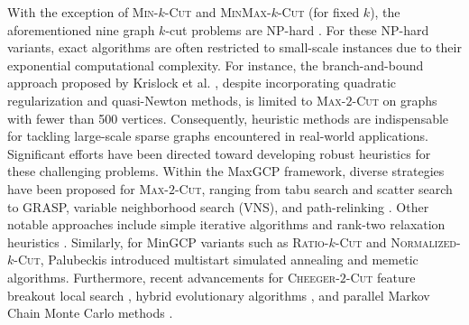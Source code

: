 \documentclass[12pt, a4paper]{article}%
\numberwithin{equation}{section}
\theoremstyle{plain}
\begin{document}
	
	With the exception of \textsc{Min}-$k$-\textsc{Cut} \cite{goldschmidt1994polynomial} and \textsc{MinMax}-$k$-\textsc{Cut} \cite{chandrasekaran2023fixed} (for fixed $k$), the aforementioned nine graph $k$-cut problems are NP-hard \cite{kann1997hardness, shahrokhi1994complexity, shao2021continuous, shi2000normalized, hagen1992new, hochbaum2013polynomial, matula1990sparsest}. For these NP-hard variants, exact algorithms are often restricted to small-scale instances due to their exponential computational complexity. For instance, the branch-and-bound approach proposed by Krislock et al. \cite{krislock2014improved}, despite incorporating quadratic regularization and quasi-Newton methods, is limited to \textsc{Max}-$2$-\textsc{Cut} on graphs with fewer than 500 vertices. Consequently, heuristic methods are indispensable for tackling large-scale sparse graphs encountered in real-world applications. Significant efforts have been directed toward developing robust heuristics for these challenging problems. Within the MaxGCP framework, diverse strategies have been proposed for \textsc{Max}-$2$-\textsc{Cut}, ranging from tabu search \cite{arraiz2009competitive} and scatter search \cite{Marti2009} to GRASP, variable neighborhood search (VNS), and path-relinking \cite{Festa2002randomized}. Other notable approaches include simple iterative algorithms \cite{shao2009maxcut} and rank-two relaxation heuristics \cite{burer2002rank}. Similarly, for MinGCP variants such as \textsc{Ratio}-$k$-\textsc{Cut} and \textsc{Normalized}-$k$-\textsc{Cut}, Palubeckis \cite{palubeckis2022metaheuristic} introduced multistart simulated annealing and memetic algorithms. Furthermore, recent advancements for \textsc{Cheeger}-$2$-\textsc{Cut} feature breakout local search \cite{lu2019stagnation}, hybrid evolutionary algorithms \cite{lu2020hybrid}, and parallel Markov Chain Monte Carlo methods \cite{chen2025monte}.
	
	
	
\end{document}
